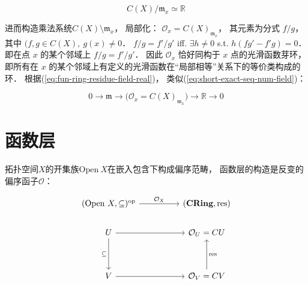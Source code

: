 \begin{equation}
C(X)/\mathfrak m_x \simeq \mathbb R
\end{equation}
\label{eq:fun-ring-residue-field-real}

进而构造乘法系统$C(X)\setminus \mathfrak m_x$，
局部化：
$\mathcal O_x = C(X)_{\mathfrak{m}_x}$，
其元素为分式 $f/g$，
其中 $(f,g \in C(X),\ g(x) \neq 0$．
$f/g = f'/g'$ iff. $\exists h \neq 0$ s.t. $h(f g' - f' g) = 0$．
即在点 $x$ 的某个邻域上 $f/g = f'/g'$．
因此 $\mathcal O_x$ 恰好同构于 $x$ 点的光滑函数芽环，
即所有在 $x$ 的某个邻域上有定义的光滑函数在“局部相等”关系下的等价类构成的环．
根据(\ref{eq:fun-ring-residue-field-real})，
类似(\ref{eq:short-exact-seq-num-field})：

\begin{equation}
0 \to \mathfrak m \to \big( \mathcal O_x = C(X)_{\mathfrak{m}_x} \big) \to \mathbb R \to 0
\end{equation}
\label{eq:short-exact-seq-fun-real}


\section{函数层}

拓扑空间$X$的开集族$\text{Open} \ X$在嵌入包含下构成偏序范畴，
函数层的构造是反变的偏序函子$\mathcal O$：

$$
\begin{tikzcd}
{(\text{Open} \ X, \subseteq)^\text{op}} \arrow[rr, "\mathcal O_X"] &  & {(\textbf{CRing}, \text{res})}              \\
U \arrow[rr] \arrow[dd, "\subseteq"']                               &  & \mathcal O_U = CU                           \\
                                                                    &  &                                             \\
V \arrow[rr]                                                        &  & \mathcal O_V = CV \arrow[uu, "\text{res}"']
\end{tikzcd}
$$

